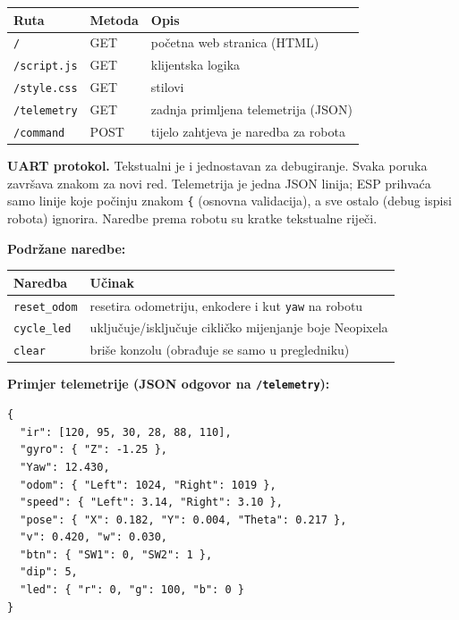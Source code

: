 \documentclass[10pt,a4paper]{article}
\begin{document}
\begin{table}[h!]
	\centering
	\begin{tabular}{@{}lll@{}}
		\toprule
		\textbf{Ruta}       & \textbf{Metoda} & \textbf{Opis}                        \\
		\midrule
		\texttt{/}          & GET             & početna web stranica (HTML)          \\
		\texttt{/script.js} & GET             & klijentska logika                    \\
		\texttt{/style.css} & GET             & stilovi                              \\
		\texttt{/telemetry} & GET             & zadnja primljena telemetrija (JSON)  \\
		\texttt{/command}   & POST            & tijelo zahtjeva je naredba za robota \\
		\bottomrule
	\end{tabular}
\end{table}

\textbf{UART protokol.} Tekstualni je i jednostavan za debugiranje. Svaka poruka završava znakom za novi red. Telemetrija je jedna JSON linija; ESP prihvaća samo linije koje počinju znakom \texttt{\{} (osnovna validacija), a sve ostalo (debug ispisi robota) ignorira. Naredbe prema robotu su kratke tekstualne riječi.
\pagebreak

\textbf{Podržane naredbe:}
\begin{table}[h!]
	\centering
	\begin{tabular}{@{}ll@{}}
		\toprule
		\textbf{Naredba}     & \textbf{Učinak}                                            \\
		\midrule
		\texttt{reset\_odom} & resetira odometriju, enkodere i kut \texttt{yaw} na robotu \\
		\texttt{cycle\_led}  & uključuje/isključuje cikličko mijenjanje boje Neopixela    \\
		\texttt{clear}       & briše konzolu (obrađuje se samo u pregledniku)             \\
		\bottomrule
	\end{tabular}
\end{table}

\textbf{Primjer telemetrije (JSON odgovor na \texttt{/telemetry}):}

\begin{lstlisting}
{
  "ir": [120, 95, 30, 28, 88, 110],
  "gyro": { "Z": -1.25 },
  "Yaw": 12.430,
  "odom": { "Left": 1024, "Right": 1019 },
  "speed": { "Left": 3.14, "Right": 3.10 },
  "pose": { "X": 0.182, "Y": 0.004, "Theta": 0.217 },
  "v": 0.420, "w": 0.030,
  "btn": { "SW1": 0, "SW2": 1 },
  "dip": 5,
  "led": { "r": 0, "g": 100, "b": 0 }
}
	\end{lstlisting}
\end{document}
